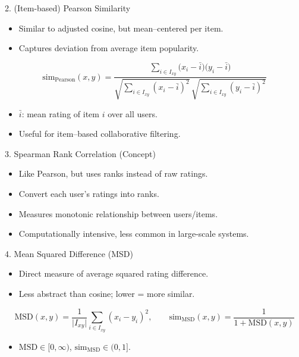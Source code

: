 \documentclass{beamer}
\begin{document}
\begin{frame}{2. (Item-based) Pearson Similarity}
\begin{itemize}
  \item Similar to adjusted cosine, but mean–centered per item.
  \item Captures deviation from average item popularity.
\end{itemize}
\[
\text{sim}_{\mathrm{Pearson}}(x,y)
= \frac{\sum_{i\in I_{xy}}\bigl(x_i - \bar i\bigr)\bigl(y_i - \bar i\bigr)}
       {\sqrt{\sum_{i\in I_{xy}}(x_i - \bar i)^2}\,
        \sqrt{\sum_{i\in I_{xy}}(y_i - \bar i)^2}}
\]
\begin{itemize}
  \item \(\bar i\): mean rating of item \(i\) over all users.
  \item Useful for item–based collaborative filtering.
\end{itemize}
\end{frame}

\begin{frame}{3. Spearman Rank Correlation (Concept)}
\begin{itemize}
  \item Like Pearson, but uses ranks instead of raw ratings.
  \item Convert each user's ratings into ranks.
  \item Measures monotonic relationship between users/items.
  \item Computationally intensive, less common in large-scale systems.
\end{itemize}
\end{frame}

\begin{frame}{4. Mean Squared Difference (MSD)}
\begin{itemize}
  \item Direct measure of average squared rating difference.
  \item Less abstract than cosine; lower = more similar.
\end{itemize}
\[
\mathrm{MSD}(x,y)
= \frac{1}{\lvert I_{xy}\rvert}
  \sum_{i\in I_{xy}}(x_i - y_i)^2,
\qquad
\mathrm{sim}_{\mathrm{MSD}}(x,y)
= \frac{1}{1 + \mathrm{MSD}(x,y)}
\]
\begin{itemize}
  \item \(\mathrm{MSD}\in[0,\infty)\), \(\mathrm{sim}_{\mathrm{MSD}}\in(0,1]\).
\end{itemize}
\end{frame}
\end{document}
